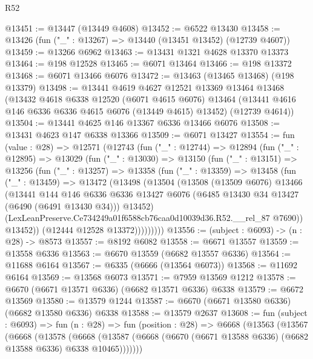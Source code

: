 \begin{lexlean}{R52}
\begin{coremodule}
@13451 := @13447 (@13449 @4608)
@13452 := @6522 @13430
@13458 := @13426 (fun ("_" : @13267) => @13440 (@13451 @13452) (@12739 @4607))
@13459 := @13266 @6962
@13463 := @13431 @1321 @4628 @13370 @13373
@13464 := @198 @12528
@13465 := @6071 @13464
@13466 := @198 @13372
@13468 := @6071 @13466 @6076
@13472 := @13463 (@13465 @13468) (@198 @13379)
@13498 := @13441
    @4619
    @4627
    @12521
    @13369
    @13464
    @13468
    (@13432
      @4618
      @6338
      @12520
      (@6071 @4615 @6076)
      @13464
      (@13441 @4616 @146 @6336 @6336 @4615 @6076 (@13449 @4615) @13452)
      (@12739 @4614))
@13504 := @13441 @4625 @146 @13367 @6336 @13466 @6076
@13508 := @13431 @4623 @147 @6338 @13366
@13509 := @6071 @13427
@13554 := fun (value : @28) =>
  @12571
    (@12743
      (fun ("_" : @12744) =>
      @12894
        (fun ("_" : @12895) =>
        @13029
          (fun ("_" : @13030) =>
          @13150
            (fun ("_" : @13151) =>
            @13256
              (fun ("_" : @13257) =>
              @13358
                (fun ("_" : @13359) =>
                @13458
                  (fun ("_" : @13459) =>
                  @13472
                    (@13498
                      (@13504
                        (@13508
                          (@13509 @6076)
                          @13466
                          (@13441
                            @144
                            @146
                            @6336
                            @6336
                            @13427
                            @6076
                            (@6485 @13430 @34 @13427 (@6490 (@6491 @13430 @34)))
                            @13452)
                          (LexLeanPreserve.Ce734249a01f6588cb76caa0d10039d36.R52.__rel_87 @7690))
                        @13452))
                    (@12444 @12528 @13372)))))))))
@13556 := (subject : @6093) -> (n : @28) -> @8573
@13557 := @8192 @6082
@13558 := @6671 @13557
@13559 := @13558 @6336
@13563 := @6670 @13559 (@6682 @13557 @6336)
@13564 := @11688 @6164
@13567 := @6335 (@6666 (@13564 @6073))
@13568 := @11692 @6164
@13569 := @13568 @6073
@13571 := @7959 @13569 @1212
@13578 := @6670 (@6671 @13571 @6336) (@6682 @13571 @6336) @6338
@13579 := @6672 @13569
@13580 := @13579 @1244
@13587 := @6670 (@6671 @13580 @6336) (@6682 @13580 @6336) @6338
@13588 := @13579 @2637
@13608 := fun (subject : @6093) =>
  fun (n : @28) =>
  fun (position : @28) =>
  @6668
    (@13563
      (@13567
        (@6668
          (@13578
            (@6668
              (@13587 (@6668 (@6670 (@6671 @13588 @6336) (@6682 @13588 @6336) @6338 @10465)))))))

\end{coremodule}
\end{lexlean}
